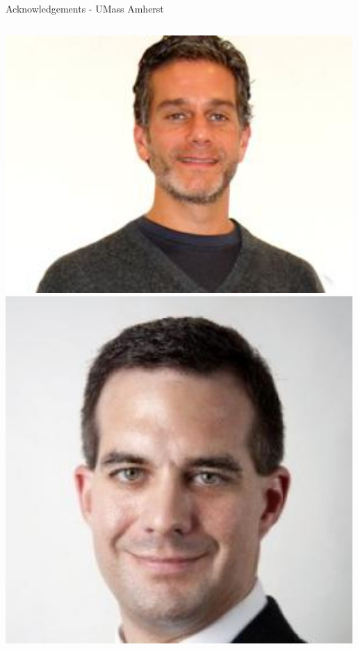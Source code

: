 \documentclass[aspectratio=169]{beamer}
\begin{document}
\begin{frame}{Acknowledgements - UMass Amherst}
    \begin{columns}

            \centering
            \includegraphics[width=0.99\textwidth]{people/umassprofs/auerbach.png}
            \includegraphics[width=0.99\textwidth]{people/umassprofs/davis.png}
            \centering

\end{columns}
\end{frame}
\end{document}
